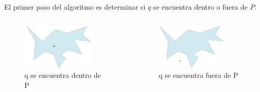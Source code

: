 \documentclass[aspectratio=169,xcolor=dvipsnames, t]{beamer}
\begin{document}
\begin{frame}
  \vspace{0.5cm}
  El primer paso del algoritmo es determinar si $q$ se encuentra dentro o fuera de $P$.\\
  \begin{columns}
    \begin{column}{0.45\textwidth}
      \begin{figure}
        \centering
        \includegraphics[width=0.8\textwidth]{imagenes/Caso1.1.png}
        \caption{q se encuentra dentro de P}
      \end{figure}
    \end{column}
    \begin{column}{0.45\textwidth}  %
      \begin{figure}
        \centering
        \includegraphics[width=0.8\textwidth]{imagenes/Caso1.2.png}
        \caption{q se encuentra fuera de P}
      \end{figure}
    \end{column}
  \end{columns}
\end{frame}
\end{document}
